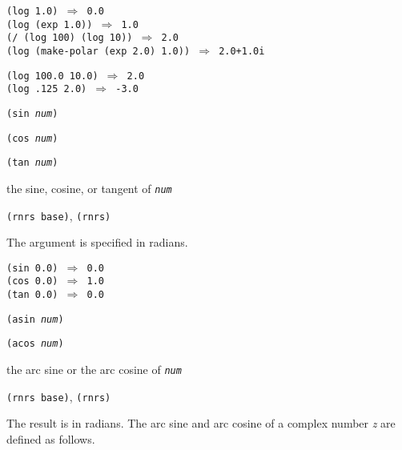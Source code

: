\begin{alltt}
(log 1.0) \(\Rightarrow\) 0.0
(log (exp 1.0)) \(\Rightarrow\) 1.0
(/ (log 100) (log 10)) \(\Rightarrow\) 2.0
(log (make-polar (exp 2.0) 1.0)) \(\Rightarrow\) 2.0+1.0i

(log 100.0 10.0) \(\Rightarrow\) 2.0
(log .125 2.0) \(\Rightarrow\) -3.0
\end{alltt}

\begin{description}

\label{objects_s131}\item[procedure] \texttt{(sin \textit{num})}



\item[procedure] \texttt{(cos \textit{num})}



\item[procedure] \texttt{(tan \textit{num})}



\item[returns] the sine, cosine, or tangent of \texttt{\textit{num}}


\item[libraries] \texttt{(rnrs base)}, \texttt{(rnrs)}
\end{description}


The argument is specified in radians.


\begin{alltt}
(sin 0.0) \(\Rightarrow\) 0.0
(cos 0.0) \(\Rightarrow\) 1.0
(tan 0.0) \(\Rightarrow\) 0.0
\end{alltt}

\begin{description}

\label{objects_s132}\item[procedure] \texttt{(asin \textit{num})}



\item[procedure] \texttt{(acos \textit{num})}



\item[returns] the arc sine or the arc cosine of \texttt{\textit{num}}


\item[libraries] \texttt{(rnrs base)}, \texttt{(rnrs)}
\end{description}


The result is in radians.
The arc sine and arc cosine of a complex number \textit{z} are defined as follows.


